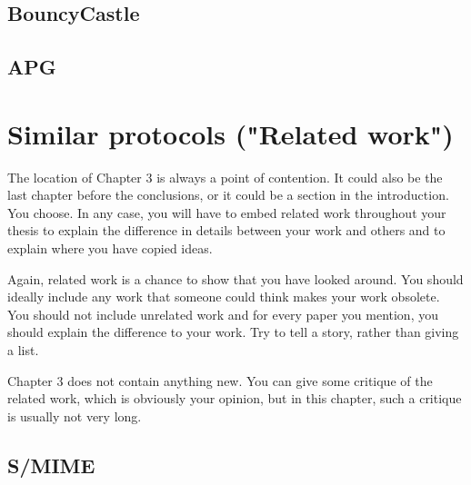 \subsection{BouncyCastle}

\subsection{APG}

\section{Similar protocols ("Related work")}

The location of Chapter 3 is always a point of contention. It
could also be the last chapter before the conclusions, or it could
be a section in the introduction. You choose. In any case, you will
have to embed related work throughout your thesis to explain
the difference in details between your work and others and to
explain where you have copied ideas.

Again, related work is a chance to show that you have looked
around. You should ideally include any work that someone could
think makes your work obsolete. You should not include unrelated
work and for every paper you mention, you should explain the
difference to your work. Try to tell a story, rather than giving a
list.

Chapter 3 does not contain anything new. You can give some critique
of the related work, which is obviously your opinion, but in this
chapter, such a critique is usually not very long.

\subsection{S/MIME}